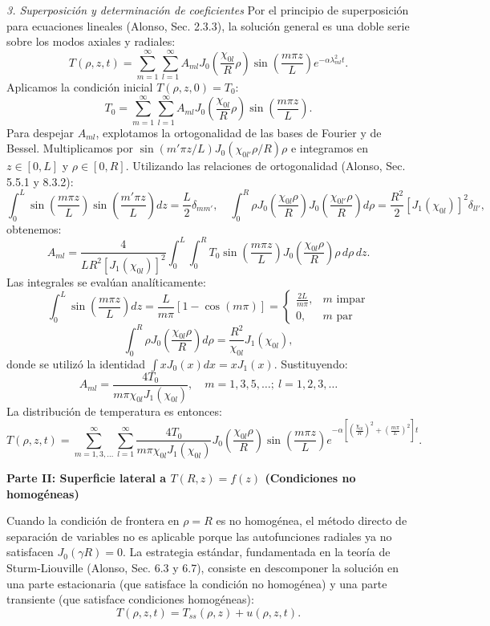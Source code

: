\documentclass[a4paper]{article}
\begin{document}
\textit{3. Superposición y determinación de coeficientes}
Por el principio de superposición para ecuaciones lineales (Alonso, Sec. 2.3.3), la solución general es una doble serie sobre los modos axiales y radiales:
$$T(\rho, z, t) = \sum_{m=1}^{\infty} \sum_{l=1}^{\infty} A_{ml} J_0\left( \frac{\chi_{0l}}{R} \rho \right) \sin\left( \frac{m\pi z}{L} \right) e^{-\alpha \lambda_{ml}^2 t}.$$
Aplicamos la condición inicial $T(\rho, z, 0) = T_0$:
$$T_0 = \sum_{m=1}^{\infty} \sum_{l=1}^{\infty} A_{ml} J_0\left( \frac{\chi_{0l}}{R} \rho \right) \sin\left( \frac{m\pi z}{L} \right).$$
Para despejar $A_{ml}$, explotamos la ortogonalidad de las bases de Fourier y de Bessel. Multiplicamos por $\sin(m'\pi z/L) J_0(\chi_{0l'} \rho/R) \rho$ e integramos en $z \in [0, L]$ y $\rho \in [0, R]$. Utilizando las relaciones de ortogonalidad (Alonso, Sec. 5.5.1 y 8.3.2):
$$\int_0^L \sin\left(\frac{m\pi z}{L}\right) \sin\left(\frac{m'\pi z}{L}\right) dz = \frac{L}{2} \delta_{mm'}, \quad \int_0^R \rho J_0\left(\frac{\chi_{0l} \rho}{R}\right) J_0\left(\frac{\chi_{0l'} \rho}{R}\right) d\rho = \frac{R^2}{2} \left[ J_1(\chi_{0l}) \right]^2 \delta_{ll'},$$
obtenemos:
$$A_{ml} = \frac{4}{L R^2 \left[ J_1(\chi_{0l}) \right]^2} \int_0^L \int_0^R T_0 \sin\left( \frac{m\pi z}{L} \right) J_0\left( \frac{\chi_{0l} \rho}{R} \right) \rho \, d\rho \, dz.$$
Las integrales se evalúan analíticamente:
$$\int_0^L \sin\left( \frac{m\pi z}{L} \right) dz = \frac{L}{m\pi} \left[ 1 - \cos(m\pi) \right] = \begin{cases} \frac{2L}{m\pi}, & m \text{ impar} \\ 0, & m \text{ par} \end{cases}$$
$$\int_0^R \rho J_0\left( \frac{\chi_{0l} \rho}{R} \right) d\rho = \frac{R^2}{\chi_{0l}} J_1(\chi_{0l}),$$
donde se utilizó la identidad $\int x J_0(x) dx = x J_1(x)$. Sustituyendo:
$$A_{ml} = \frac{4 T_0}{m\pi \chi_{0l} J_1(\chi_{0l})}, \quad m = 1, 3, 5, \dots; \ l = 1, 2, 3, \dots$$
La distribución de temperatura es entonces:
$$T(\rho, z, t) = \sum_{m=1,3,\dots}^{\infty} \sum_{l=1}^{\infty} \frac{4 T_0}{m\pi \chi_{0l} J_1(\chi_{0l})} J_0\left( \frac{\chi_{0l} \rho}{R} \right) \sin\left( \frac{m\pi z}{L} \right) e^{-\alpha \left[ \left( \frac{\chi_{0l}}{R} \right)^2 + \left( \frac{m\pi}{L} \right)^2 \right] t}.$$

\textbf{Parte II: Superficie lateral a $T(R, z) = f(z)$ (Condiciones no homogéneas)}

Cuando la condición de frontera en $\rho = R$ es no homogénea, el método directo de separación de variables no es aplicable porque las autofunciones radiales ya no satisfacen $J_0(\gamma R) = 0$. La estrategia estándar, fundamentada en la teoría de Sturm-Liouville (Alonso, Sec. 6.3 y 6.7), consiste en descomponer la solución en una parte estacionaria (que satisface la condición no homogénea) y una parte transiente (que satisface condiciones homogéneas):
$$T(\rho, z, t) = T_{ss}(\rho, z) + u(\rho, z, t).$$
\end{document}
